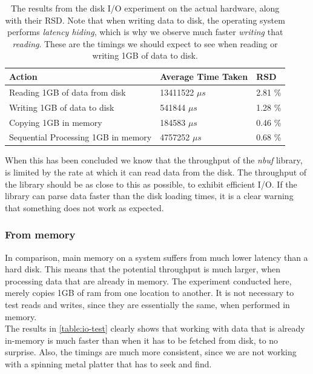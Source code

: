 \documentclass[a4paper]{article}
\newcommand{\nbuf}{\textit{nbuf} }
\begin{document}
\begin{table}[]
\begin{adjustwidth}{-0.5in}{-0.5in}
\centering
\begin{tabular}{@{}lll@{}}
\toprule
\textbf{Action}                & \textbf{Average Time Taken} & \textbf{RSD} \\ \midrule
Reading 1GB of data from disk  & 13411522 $\mu s$            & 2.81 \%      \\ \midrule
Writing 1GB of data to disk    & 541844   $\mu s$            & 1.28 \%      \\ \midrule
Copying 1GB in memory          & 184583   $\mu s$            & 0.46 \%      \\ \midrule
Sequential Processing 1GB in memory       & 4757252  $\mu s$            & 0.68 \%      \\ \bottomrule
\end{tabular}

\caption{The results from the disk I/O experiment on the actual hardware, along with their RSD. Note that when writing data to disk, the operating system performs \textit{latency hiding}, which is why we observe much faster \textit{writing} that \textit{reading}. These are the timings we should expect to see when reading or writing 1GB of data to disk.}
\label{table:io-test}
\end{adjustwidth}
\end{table}

When this has been concluded we know that the throughput of the \nbuf library, is limited by the rate at which it can read data from the disk. The throughput of the library should be as close to this as possible, to exhibit efficient I/O. If the library can parse data faster than the disk loading times, it is a clear warning that something does not work as expected.


\subsubsection{From memory}
In comparison, main memory on a system suffers from much lower latency than a hard disk. This means that the potential throughput is much larger, when processing data that are already in memory. The experiment conducted here, merely copies 1GB of ram from one location to another. It is not necessary to test reads and writes, since they are essentially the same, when performed in memory.\\

The results in \autoref{table:io-test} clearly shows that working with data that is already in-memory is much faster than when it has to be fetched from disk, to no surprise. Also, the timings are much more consistent, since we are not working with a spinning metal platter that has to seek and find.\\
\end{document}
